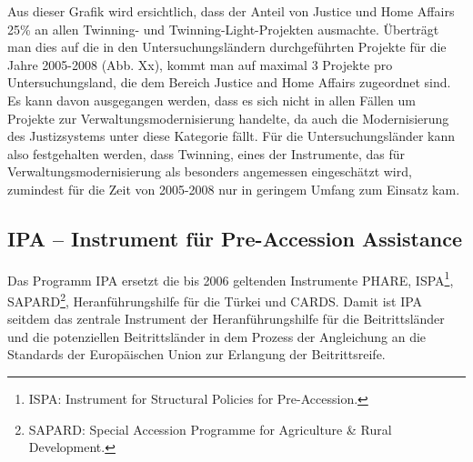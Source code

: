 Aus dieser Grafik wird ersichtlich, dass der Anteil von Justice und Home Affairs 25\% an allen Twinning- und Twinning-Light-Projekten ausmachte. Überträgt man dies auf die in den Untersuchungsländern durchgeführten Projekte für die Jahre 2005-2008 (Abb. Xx), kommt man auf maximal 3 Projekte pro Untersuchungsland, die dem Bereich Justice and Home Affairs zugeordnet sind. Es kann davon ausgegangen werden, dass es sich nicht in allen Fällen um Projekte zur Verwaltungsmodernisierung handelte, da auch die Modernisierung des Justizsystems unter diese Kategorie fällt. Für die Untersuchungsländer kann also festgehalten werden, dass Twinning, eines der Instrumente, das für Verwaltungsmodernisierung als besonders angemessen eingeschätzt wird, zumindest für die Zeit von 2005-2008 nur in geringem Umfang zum Einsatz kam.
\subsection{IPA – Instrument für Pre-Accession Assistance}
Das Programm IPA ersetzt die bis 2006 geltenden Instrumente PHARE, ISPA\footnote{ISPA: Instrument for Structural Policies for Pre-Accession.}, SAPARD\footnote{SAPARD: Special Accession Programme for Agriculture \& Rural Development.}, Heranführungshilfe für die Türkei und CARDS. Damit ist IPA seitdem das zentrale Instrument der Heranführungshilfe für die Beitrittsländer und die potenziellen Beitrittsländer in dem Prozess der Angleichung an die Standards der Europäischen Union zur Erlangung der Beitrittsreife.\par

